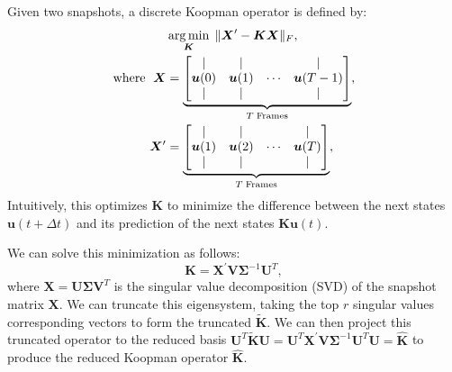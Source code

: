 Given two snapshots, a discrete Koopman operator is defined by:
\begin{equation}
    \label{eqn:reduced_koopman}
    \begin{aligned}
        &\operatorname*{arg\,min}_{{\bm{K}}} \; \|\bm{X}^\prime - {{\bm{K}}} \bm{X}\|_F,  \\
        \text{where } \; 
        \bm{X} &= \underbrace{
            \begin{bmatrix}
                \vert & \vert &        & \vert \\
                \bm{u}(0) & \bm{u}(1) & \cdots & \bm{u}(T-1) \\
                \vert & \vert &        & \vert \\
            \end{bmatrix}}_{T \;\text{Frames}
        },
        \\
        \bm{X}^\prime &=
        \underbrace{
            \begin{bmatrix}
                \vert & \vert &        & \vert \\
                \bm{u}(1) & \bm{u}(2) & \cdots & \bm{u}(T) \\
                \vert & \vert &        & \vert \\
            \end{bmatrix}}_{T \;\text{Frames}
        },
    \end{aligned}
\end{equation}
Intuitively, this optimizes ${{\bm{K}}}$ to minimize the difference between the next states $\bm{u}(t+\Delta{}t)$ and its prediction of the next states ${\bm{K}}\bm{u}(t)$.

We can solve this minimization as follows:
\begin{equation}
    \label{eqn:reduced_koopman_solution}
    {\bm{K}} = \bm{X}^\prime \bm V \bm \Sigma^{-1} \bm U^T,
\end{equation}
where $\bm{X} = \bm{U} \bm{\Sigma} \bm{V}^T$ is the singular value decomposition (SVD) of the snapshot matrix $\bm{X}$.
We can truncate this eigensystem, taking the top $r$ singular values corresponding vectors to form the truncated \koopman{} $\tilde{\bm{K}}$. 
We can then project this truncated operator to the reduced basis $\bm{U}^T\tilde{\bm{K}}\bm{U} =  \bm{U}^T\bm{X}^\prime \bm V \bm \Sigma^{-1} \bm U^T\bm{U} = \hat{\bm{K}}$ to produce the reduced Koopman operator $\hat{\bm{K}}$.

